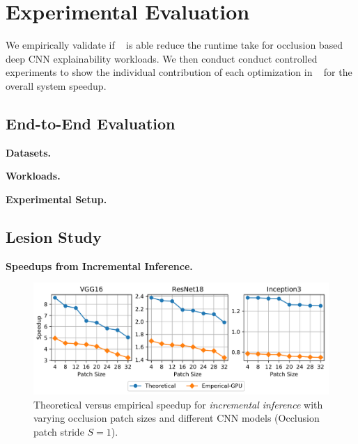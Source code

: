 \section{Experimental Evaluation}
We empirically validate if \system~ is able reduce the runtime take for occlusion based deep CNN explainability workloads.
We then conduct conduct controlled experiments to show the individual contribution of each optimization in \system~ for the overall system speedup.

\subsection{End-to-End Evaluation}

\vspace{2mm}
\noindent \textbf{Datasets.}

\vspace{2mm}
\noindent \textbf{Workloads.}

\vspace{2mm}
\noindent \textbf{Experimental Setup.}

\subsection{Lesion Study}

\vspace{2mm}
\noindent \textbf{Speedups from Incremental Inference.}
\begin{figure}[t]
\includegraphics[width=\columnwidth]{images/5_2_1_GPU}
\caption{Theoretical versus empirical speedup for \textit{incremental inference} with varying occlusion patch sizes and different CNN models (Occlusion patch stride $S=1$).}
\label{fig:5_2_1_GPU}
\end{figure}


